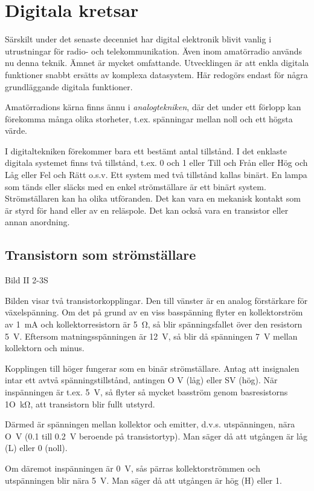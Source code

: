 \section{Digitala kretsar}

Särskilt under det senaste decenniet har digital elektronik blivit vanlig i
utrustningar för radio- och telekommunikation. Även inom amatörradio används nu
denna teknik. Ämnet är mycket omfattande. Utvecklingen är att enkla digitala
funktioner snabbt ersätts av komplexa datasystem. Här redogörs endast för några
grundläggande digitala funktioner.

Amatörradions kärna finns ännu i \emph{analogtekniken}, där det under ett
förlopp kan förekomma många olika storheter, t.ex. spänningar mellan noll och
ett högsta värde.

I digitaltekniken förekommer bara ett bestämt antal tillstånd. I det enklaste
digitala systemet finns två tillstånd, t.ex. 0 och 1 eller Till och Från eller
Hög och Låg eller Fel och Rätt o.s.v. Ett system med två tillstånd kallas
binärt. En lampa som tänds eller släcks med en enkel strömställare är ett binärt
system. Strömställaren kan ha olika utföranden. Det kan vara en mekanisk kontakt
som är styrd för hand eller av en reläspole. Det kan också vara en transistor
eller annan anordning.

\subsection{Transistorn som strömställare}

Bild II 2-3S

Bilden visar två transistorkopplingar. Den till vänster är en analog förstärkare
för växelspänning. Om det på grund av en viss basspänning flyter en
kollektorström av 1~mA och kollektorresistorn är 5~Ω, så blir spänningsfallet
över den resistorn 5~V. Eftersom matningsspänningen är 12~V, så blir då
spänningen 7~V mellan kollektorn och minus.

Kopplingen till höger fungerar som en binär strömställare. Antag att insignalen
intar ett avtvå spänningstillstånd, antingen O V (låg) eller SV (hög). När
inspänningen är t.ex. 5~V, så flyter så mycket basström genom basresistorns
1O~kΩ, att transistorn blir fullt utstyrd.

Därmed är spänningen mellan kollektor och emitter, d.v.s. utspänningen, nära O~V
(0.1 till 0.2~V beroende på transistortyp). Man säger då att utgången är låg (L)
eller 0 (noll).

Om däremot inspänningen är 0~V, sås pärras kollektorströmmen och utspänningen
blir nära 5~V. Man säger då att utgången är hög (H) eller 1.

